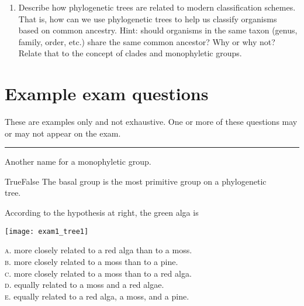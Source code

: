 \documentclass[letterpaper]{tufte-handout}
\begin{document}
\begin{enumerate}
	\item Describe how phylogenetic trees are related  to modern classification schemes. That is, how can we use phylogenetic trees to help us classify organisms based on common ancestry. Hint: should organisms in the same taxon (genus, family, order, etc.) share the same common ancestor? Why or why not? Relate that to the concept of clades and monophyletic groups.

\end{enumerate}
\section*{Example exam questions}

These are examples only and not exhaustive. One or more of these questions may or may not appear on the exam.

\bigskip

\noindent \rule{1in}{0.4pt} Another name for a monophyletic group.

\bigskip

\noindent True\hspace{1em}False\hspace{1em} The basal group is the most primitive group on a phylogenetic  \\
\noindent {} tree.

\bigskip

\noindent According to the hypothesis at right, the green alga is

\smallskip
\begin{marginfigure}[0.75in]
	\texttt{[image: exam1\_tree1]}
\end{marginfigure}

\noindent \textsc{a}. more closely related to a red alga than to a moss.\\
\noindent \textsc{b}. more closely related to a moss than to a pine. \\
\noindent \textsc{c}. more closely related to a moss than to a red alga. \\
\noindent \textsc{d}. equally related to a moss and a red algae. \\
\noindent \textsc{e}. equally related to a red alga, a moss, and a pine.
\end{document}
